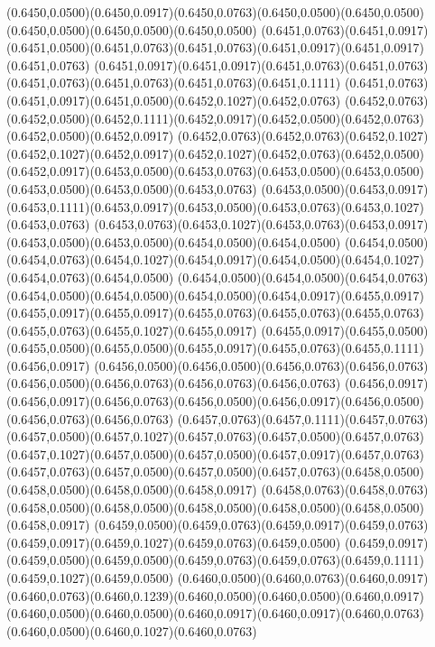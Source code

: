 (0.6450,0.0500)(0.6450,0.0917)(0.6450,0.0763)(0.6450,0.0500)(0.6450,0.0500)(0.6450,0.0500)(0.6450,0.0500)(0.6450,0.0500)
(0.6451,0.0763)(0.6451,0.0917)(0.6451,0.0500)(0.6451,0.0763)(0.6451,0.0763)(0.6451,0.0917)(0.6451,0.0917)(0.6451,0.0763)
(0.6451,0.0917)(0.6451,0.0917)(0.6451,0.0763)(0.6451,0.0763)(0.6451,0.0763)(0.6451,0.0763)(0.6451,0.0763)(0.6451,0.1111)
(0.6451,0.0763)(0.6451,0.0917)(0.6451,0.0500)(0.6452,0.1027)(0.6452,0.0763)
\PST@Solid(0.6452,0.0763)(0.6452,0.0500)(0.6452,0.1111)(0.6452,0.0917)(0.6452,0.0500)(0.6452,0.0763)(0.6452,0.0500)(0.6452,0.0917)
(0.6452,0.0763)(0.6452,0.0763)(0.6452,0.1027)(0.6452,0.1027)(0.6452,0.0917)(0.6452,0.1027)(0.6452,0.0763)(0.6452,0.0500)
(0.6452,0.0917)(0.6453,0.0500)(0.6453,0.0763)(0.6453,0.0500)(0.6453,0.0500)(0.6453,0.0500)(0.6453,0.0500)(0.6453,0.0763)
(0.6453,0.0500)(0.6453,0.0917)(0.6453,0.1111)(0.6453,0.0917)(0.6453,0.0500)(0.6453,0.0763)(0.6453,0.1027)(0.6453,0.0763)
(0.6453,0.0763)(0.6453,0.1027)(0.6453,0.0763)(0.6453,0.0917)(0.6453,0.0500)(0.6453,0.0500)(0.6454,0.0500)(0.6454,0.0500)
(0.6454,0.0500)(0.6454,0.0763)(0.6454,0.1027)(0.6454,0.0917)(0.6454,0.0500)(0.6454,0.1027)(0.6454,0.0763)(0.6454,0.0500)
(0.6454,0.0500)(0.6454,0.0500)(0.6454,0.0763)(0.6454,0.0500)(0.6454,0.0500)(0.6454,0.0500)(0.6454,0.0917)(0.6455,0.0917)
(0.6455,0.0917)(0.6455,0.0917)(0.6455,0.0763)(0.6455,0.0763)(0.6455,0.0763)(0.6455,0.0763)(0.6455,0.1027)(0.6455,0.0917)
(0.6455,0.0917)(0.6455,0.0500)(0.6455,0.0500)(0.6455,0.0500)(0.6455,0.0917)(0.6455,0.0763)(0.6455,0.1111)(0.6456,0.0917)
(0.6456,0.0500)(0.6456,0.0500)(0.6456,0.0763)(0.6456,0.0763)(0.6456,0.0500)(0.6456,0.0763)(0.6456,0.0763)(0.6456,0.0763)
(0.6456,0.0917)(0.6456,0.0917)(0.6456,0.0763)(0.6456,0.0500)(0.6456,0.0917)(0.6456,0.0500)(0.6456,0.0763)(0.6456,0.0763)
(0.6457,0.0763)(0.6457,0.1111)(0.6457,0.0763)(0.6457,0.0500)(0.6457,0.1027)(0.6457,0.0763)(0.6457,0.0500)(0.6457,0.0763)
(0.6457,0.1027)(0.6457,0.0500)(0.6457,0.0500)(0.6457,0.0917)(0.6457,0.0763)
\PST@Solid(0.6457,0.0763)(0.6457,0.0500)(0.6457,0.0500)(0.6457,0.0763)(0.6458,0.0500)(0.6458,0.0500)(0.6458,0.0500)(0.6458,0.0917)
(0.6458,0.0763)(0.6458,0.0763)(0.6458,0.0500)(0.6458,0.0500)(0.6458,0.0500)(0.6458,0.0500)(0.6458,0.0500)(0.6458,0.0917)
(0.6459,0.0500)(0.6459,0.0763)(0.6459,0.0917)(0.6459,0.0763)(0.6459,0.0917)(0.6459,0.1027)(0.6459,0.0763)(0.6459,0.0500)
(0.6459,0.0917)(0.6459,0.0500)(0.6459,0.0500)(0.6459,0.0763)(0.6459,0.0763)(0.6459,0.1111)(0.6459,0.1027)(0.6459,0.0500)
(0.6460,0.0500)(0.6460,0.0763)(0.6460,0.0917)(0.6460,0.0763)(0.6460,0.1239)(0.6460,0.0500)(0.6460,0.0500)(0.6460,0.0917)
(0.6460,0.0500)(0.6460,0.0500)(0.6460,0.0917)(0.6460,0.0917)(0.6460,0.0763)(0.6460,0.0500)(0.6460,0.1027)(0.6460,0.0763)
